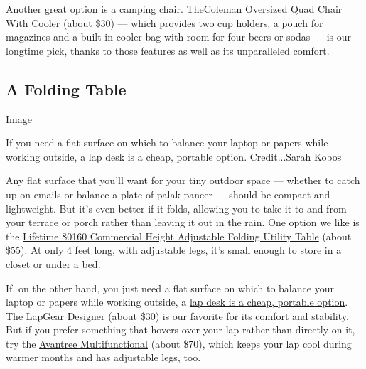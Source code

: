 Another great option is a
\href{https://www.nytimes3xbfgragh.onion/wirecutter/reviews/best-portable-outdoor-chairs/?utm_source=nytimes\&utm_medium=referral\&utm_campaign=outdoor-space}{camping
chair}.
The\href{https://www.nytimes3xbfgragh.onion/wirecutter/reviews/best-portable-outdoor-chairs/?utm_source=nytimes\&utm_medium=referral\&utm_campaign=outdoor-space\#our-pick-coleman-oversized-quad-chair-with-cooler}{Coleman
Oversized Quad Chair With Cooler} (about \$30) --- which provides two
cup holders, a pouch for magazines and a built-in cooler bag with room
for four beers or sodas --- is our longtime pick, thanks to those
features as well as its unparalleled comfort.

\hypertarget{a-folding-table}{%
\subsection{A Folding Table}\label{a-folding-table}}

Image

If you need a flat surface on which to balance your laptop or papers
while working outside, a lap desk is a cheap, portable option.
Credit...Sarah Kobos

Any flat surface that you'll want for your tiny outdoor space ---
whether to catch up on emails or balance a plate of palak paneer ---
should be compact and lightweight. But it's even better if it folds,
allowing you to take it to and from your terrace or porch rather than
leaving it out in the rain. One option we like is the
\href{https://www.nytimes3xbfgragh.onion/wirecutter/reviews/best-folding-tables/?utm_source=nytimes\&utm_medium=referral\&utm_campaign=outdoor-space\#a-small-table-for-kids-or-crafts-lifetime-commercial-height-adjustable-folding-utility-table}{Lifetime
80160 Commercial Height Adjustable Folding Utility Table} (about \$55).
At only 4 feet long, with adjustable legs, it's small enough to store in
a closet or under a bed.

If, on the other hand, you just need a flat surface on which to balance
your laptop or papers while working outside, a
\href{https://www.nytimes3xbfgragh.onion/wirecutter/reviews/best-lap-desk/?utm_source=nytimes\&utm_medium=referral\&utm_campaign=outdoor-space}{lap
desk is a cheap, portable option}. The
\href{https://www.nytimes3xbfgragh.onion/wirecutter/reviews/best-lap-desk/?utm_source=nytimes\&utm_medium=referral\&utm_campaign=outdoor-space\#our-pick-lapgear-designer}{LapGear
Designer} (about \$30) is our favorite for its comfort and stability.
But if you prefer something that hovers over your lap rather than
directly on it, try the
\href{https://www.nytimes3xbfgragh.onion/wirecutter/reviews/best-lap-desk/?utm_source=nytimes\&utm_medium=referral\&utm_campaign=outdoor-space\#also-great-avantree-multifunctional}{Avantree
Multifunctional} (about \$70), which keeps your lap cool during warmer
months and has adjustable legs, too.

